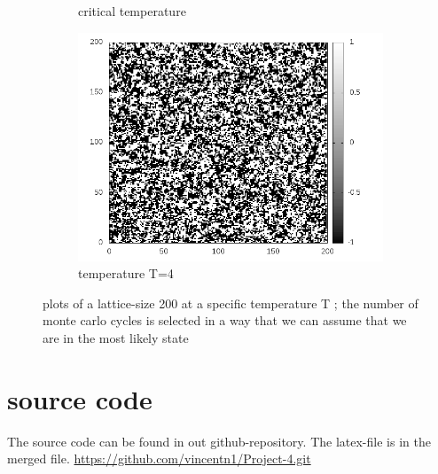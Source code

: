 \documentclass[10pt,a4paper]{article}
\begin{document}
\begin{figure}[h]
\begin{subfigure}{.5\textwidth}
  \caption{critical temperature}
  \label{fig:sfig3}
\end{subfigure}
\begin{subfigure}{.5\textwidth}
  \centering
  \includegraphics[width=.8\linewidth]{spinlatticeT4.png}
  \caption{temperature T=4}
  \label{fig:sfig4}
\end{subfigure}
\caption{plots of a lattice-size 200 at a specific temperature T ; the number of monte carlo cycles is selected in a  way that we can assume that we are in the most likely state }
\label{fig:fig}
\end{figure}
\section{source code}
The source code can  be found in out github-repository. The latex-file is in the merged file.
\url{https://github.com/vincentn1/Project-4.git}
\end{document}
